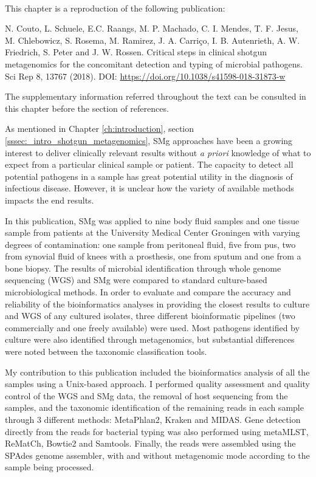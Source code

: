\mbox{}\\
\vspace{8cm}

This chapter is a reproduction of the following publication:

N. Couto, L. Schuele, E.C. Raangs, M. P. Machado, C. I. Mendes, T. F. Jesus, M. Chlebowicz,  S. Rosema, M. Ramirez, J. A. Carriço, I. B. Autenrieth, A. W. Friedrich, S. Peter and J. W. Rossen. Critical steps in clinical shotgun metagenomics for the concomitant detection and typing of microbial pathogens. Sci Rep 8, 13767 (2018). DOI: \url{https://doi.org/10.1038/s41598-018-31873-w}

The supplementary information referred throughout the text can be consulted in this chapter before the section of references. 

As mentioned in Chapter \ref{ch:introduction}, section \ref{sssec:_intro_shotgun_metagenomics}, \ac{SMg} approaches have been a growing interest to deliver clinically relevant results without \textit{a priori} knowledge of what to expect from a particular clinical sample or patient. 
The capacity to detect all potential pathogens in a sample has great potential utility in the diagnosis of infectious disease. 
However, it is unclear how the variety of available methods impacts the end results.

In this publication, \ac{SMg} was applied to nine body fluid samples and one tissue sample from patients at the University Medical Center Groningen with varying degrees of contamination: one sample from peritoneal fluid, five from pus, two from synovial fluid of knees with a prosthesis, one from sputum and one from a bone biopsy. The results of microbial identification through whole genome sequencing (\ac{WGS}) and \ac{SMg} were compared to standard culture-based microbiological methods. 
In order to evaluate and compare the accuracy and reliability of the bioinformatics analyses in providing the closest results to culture and \ac{WGS} of any cultured isolates, three different bioinformatic pipelines (two commercially and one freely available) were used. Most pathogens identified by culture were also identified through metagenomics, but substantial differences were noted between the taxonomic classification tools. 

My contribution to this publication included the bioinformatics analysis of all the samples using a Unix-based approach. I performed quality assessment and quality control of the \ac{WGS} and \ac{SMg} data, the removal of host sequencing from the samples, and the taxonomic identification of the remaining reads in each sample through 3 different methods: MetaPhlan2, Kraken and MIDAS. Gene detection directly from the reads for bacterial typing was also performed using metaMLST, ReMatCh, Bowtie2 and Samtools. Finally, the reads were assembled using the SPAdes genome assembler, with and without metagenomic mode according to the sample being processed. 

